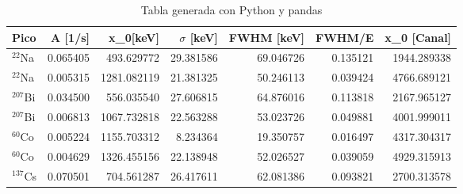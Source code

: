 \begin{table}
\caption{Tabla generada con Python y pandas}
\label{tab:datos}
\begin{tabular}{lrrrrrr}
\toprule
Pico & A [1/s] &  x_0[keV] &  $\sigma$ [keV] & FWHM [keV] & FWHM/E &  x_0 [Canal] \\
\midrule
$^{22}$Na & 0.065405 & 493.629772 & 29.381586 & 69.046726 & 0.135121 & 1944.289338 \\
$^{22}$Na & 0.005315 & 1281.082119 & 21.381325 & 50.246113 & 0.039424 & 4766.689121 \\
$^{207}$Bi & 0.034500 & 556.035540 & 27.606815 & 64.876016 & 0.113818 & 2167.965127 \\
$^{207}$Bi & 0.006813 & 1067.732818 & 22.563288 & 53.023726 & 0.049881 & 4001.999011 \\
$^{60}$Co & 0.005224 & 1155.703312 & 8.234364 & 19.350757 & 0.016497 & 4317.304317 \\
$^{60}$Co & 0.004629 & 1326.455156 & 22.138948 & 52.026527 & 0.039059 & 4929.315913 \\
$^{137}$Cs & 0.070501 & 704.561287 & 26.417611 & 62.081386 & 0.093821 & 2700.313578 \\
\bottomrule
\end{tabular}
\end{table}
